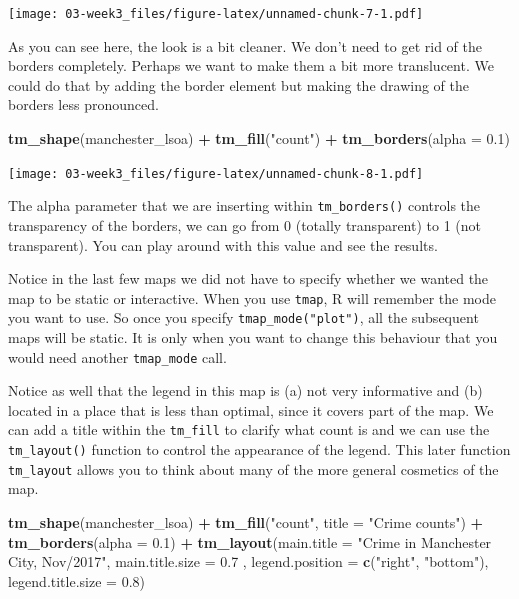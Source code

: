 \documentclass[]{book}
\newenvironment{Shaded}{\begin{snugshade}}{\end{snugshade}}
\newcommand{\DataTypeTok}[1]{\textcolor[rgb]{0.13,0.29,0.53}{#1}}
\newcommand{\FloatTok}[1]{\textcolor[rgb]{0.00,0.00,0.81}{#1}}
\newcommand{\KeywordTok}[1]{\textcolor[rgb]{0.13,0.29,0.53}{\textbf{#1}}}
\newcommand{\NormalTok}[1]{#1}
\newcommand{\OperatorTok}[1]{\textcolor[rgb]{0.81,0.36,0.00}{\textbf{#1}}}
\newcommand{\StringTok}[1]{\textcolor[rgb]{0.31,0.60,0.02}{#1}}
\begin{document}
\texttt{[image: 03-week3\_files/figure-latex/unnamed-chunk-7-1.pdf]}

As you can see here, the look is a bit cleaner. We don't need to get rid of the borders completely. Perhaps we want to make them a bit more translucent. We could do that by adding the border element but making the drawing of the borders less pronounced.

\begin{Shaded}
\begin{Highlighting}[]
\KeywordTok{tm_shape}\NormalTok{(manchester_lsoa) }\OperatorTok{+}\StringTok{ }
\StringTok{  }\KeywordTok{tm_fill}\NormalTok{(}\StringTok{"count"}\NormalTok{) }\OperatorTok{+}
\StringTok{  }\KeywordTok{tm_borders}\NormalTok{(}\DataTypeTok{alpha =} \FloatTok{0.1}\NormalTok{)}
\end{Highlighting}
\end{Shaded}

\texttt{[image: 03-week3\_files/figure-latex/unnamed-chunk-8-1.pdf]}

The alpha parameter that we are inserting within \texttt{tm\_borders()} controls the transparency of the borders, we can go from 0 (totally transparent) to 1 (not transparent). You can play around with this value and see the results.

Notice in the last few maps we did not have to specify whether we wanted the map to be static or interactive. When you use \texttt{tmap}, R will remember the mode you want to use. So once you specify \texttt{tmap\_mode("plot")}, all the subsequent maps will be static. It is only when you want to change this behaviour that you would need another \texttt{tmap\_mode} call.

Notice as well that the legend in this map is (a) not very informative and (b) located in a place that is less than optimal, since it covers part of the map. We can add a title within the \texttt{tm\_fill} to clarify what count is and we can use the \texttt{tm\_layout()} function to control the appearance of the legend. This later function \texttt{tm\_layout} allows you to think about many of the more general cosmetics of the map.

\begin{Shaded}
\begin{Highlighting}[]
\KeywordTok{tm_shape}\NormalTok{(manchester_lsoa) }\OperatorTok{+}\StringTok{ }
\StringTok{  }\KeywordTok{tm_fill}\NormalTok{(}\StringTok{"count"}\NormalTok{, }\DataTypeTok{title =} \StringTok{"Crime counts"}\NormalTok{) }\OperatorTok{+}
\StringTok{  }\KeywordTok{tm_borders}\NormalTok{(}\DataTypeTok{alpha =} \FloatTok{0.1}\NormalTok{) }\OperatorTok{+}
\StringTok{  }\KeywordTok{tm_layout}\NormalTok{(}\DataTypeTok{main.title =} \StringTok{"Crime in Manchester City, Nov/2017"}\NormalTok{, }\DataTypeTok{main.title.size =} \FloatTok{0.7}\NormalTok{ ,}
            \DataTypeTok{legend.position =} \KeywordTok{c}\NormalTok{(}\StringTok{"right"}\NormalTok{, }\StringTok{"bottom"}\NormalTok{), }\DataTypeTok{legend.title.size =} \FloatTok{0.8}\NormalTok{)}
\end{Highlighting}
\end{Shaded}
\end{document}
